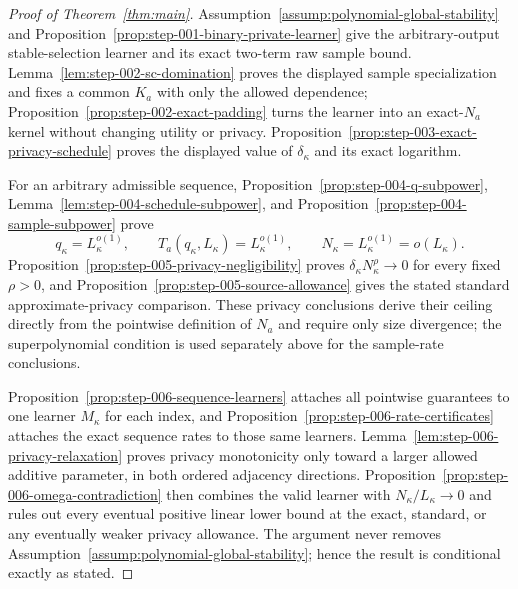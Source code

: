 \begin{proof}[Proof of Theorem~\ref{thm:main}]
Assumption~\ref{assump:polynomial-global-stability} and
Proposition~\ref{prop:step-001-binary-private-learner} give the
arbitrary-output stable-selection learner and its exact two-term raw
sample bound.  Lemma~\ref{lem:step-002-sc-domination} proves the
displayed sample specialization and fixes a common \(K_a\) with only
the allowed dependence; Proposition~\ref{prop:step-002-exact-padding}
turns the learner into an exact-\(N_a\) kernel without changing
utility or privacy.  Proposition~\ref{prop:step-003-exact-privacy-schedule}
proves the displayed value of \(\delta_\kappa\) and its exact
logarithm.

For an arbitrary admissible sequence,
Proposition~\ref{prop:step-004-q-subpower},
Lemma~\ref{lem:step-004-schedule-subpower}, and
Proposition~\ref{prop:step-004-sample-subpower} prove
\[
q_\kappa=L_\kappa^{o(1)},\qquad
T_a(q_\kappa,L_\kappa)=L_\kappa^{o(1)},\qquad
N_\kappa=L_\kappa^{o(1)}=o(L_\kappa).
\]
Proposition~\ref{prop:step-005-privacy-negligibility} proves
\(\delta_\kappa N_\kappa^\rho\to0\) for every fixed \(\rho>0\), and
Proposition~\ref{prop:step-005-source-allowance} gives the stated
standard approximate-privacy comparison.  These privacy conclusions
derive their ceiling directly from the pointwise definition of
\(N_a\) and require only size divergence; the superpolynomial
condition is used separately above for the sample-rate conclusions.

Proposition~\ref{prop:step-006-sequence-learners} attaches all
pointwise guarantees to one learner \(M_\kappa\) for each index, and
Proposition~\ref{prop:step-006-rate-certificates} attaches the exact
sequence rates to those same learners.  Lemma~\ref{lem:step-006-privacy-relaxation}
proves privacy monotonicity only toward a larger allowed additive
parameter, in both ordered adjacency directions.
Proposition~\ref{prop:step-006-omega-contradiction} then combines the
valid learner with \(N_\kappa/L_\kappa\to0\) and rules out every
eventual positive linear lower bound at the exact, standard, or any
eventually weaker privacy allowance.  The argument never removes
Assumption~\ref{assump:polynomial-global-stability}; hence the result
is conditional exactly as stated.
\end{proof}
